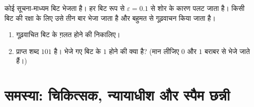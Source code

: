 \begin{exercise}[$\star\star\star$]\label{exo:g12:condprob:8}
कोई सूचना-माध्यम बिट भेजता है। हर बिट  रूप से  $\varepsilon = 0.1$ से शोर
के कारण पलट जाता है। किसी बिट की रक्षा के लिए उसे तीन बार भेजा जाता है और
बहुमत से गूढ़वाचन किया जाता है।
\begin{enumerate}
  \item गूढ़वाचित बिट के ग़लत होने की  निकालिए।
  \item प्राप्त शब्द $101$ है। भेजे गए बिट के $1$ होने की  क्या
        है? (मान लीजिए $0$ और $1$ बराबर  से भेजे जाते हैं।)
\end{enumerate}
\end{exercise}

\section{समस्या: चिकित्सक, न्यायाधीश और स्पैम छन्नी}

